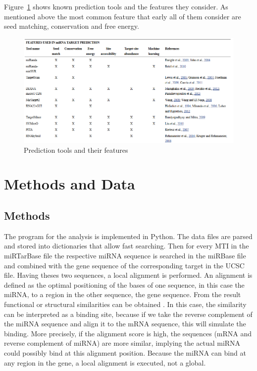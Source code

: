 \documentclass[12pt]{article}
\begin{document}
   

Figure~\ref{fig:tools} shows known prediction tools and the features they consider. As mentioned above the most common feature that early all of them consider are seed matching, conservation and free energy. 


\begin{figure}
\centering
\includegraphics[scale=0.5]{results/tools.PNG}
\caption{Prediction tools and their features}
\label{fig:tools}
\end{figure}


\section{Methods and Data}
\subsection{Methods}
The program for the analysis is implemented in Python. The data files are parsed and stored into dictionaries that allow fast searching. Then for every MTI in the miRTarBase file the respective miRNA sequence is searched in the miRBase file and combined with the gene sequence of the corresponding target in the UCSC file. Having theses two sequences, a local alignment is performed. An alignment is defined as the optimal positioning of the bases of one sequence, in this case the miRNA, to a region in the other sequence, the gene sequence. From the result functional or structural similarities can be obtained \cite{alignment}. In this case, the similarity can be interpreted as a binding site, because if we take the reverse complement of the miRNA sequence and align it to the mRNA sequence, this will simulate the binding. More precisely, if the alignment score is high, the sequences (mRNA and reverse complement of miRNA) are more similar, implying  the actual miRNA could possibly bind at this alignment position. Because the miRNA can bind at any region in the gene, a local alignment is executed, not a global.
\end{document}
